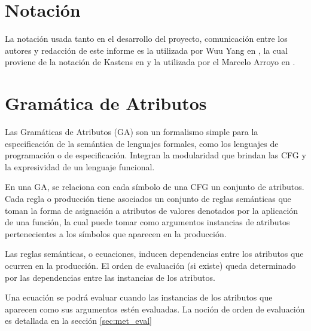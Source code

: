 \section{Notación}

La notación usada tanto en el desarrollo del proyecto, comunicación entre los autores y redacción de este informe es la utilizada por Wuu Yang en \cite{wuu-yang1}, la cual proviene de la notación de Kastens en \cite{kastens} y la utilizada por el Marcelo Arroyo en \cite{tesismarcelo}.

\section{Gramática de Atributos}

Las Gramáticas de Atributos (GA) son un formalismo simple para la especificación de la semántica de lenguajes formales, como los lenguajes de programación o de especificación. Integran la modularidad que brindan las CFG y la expresividad de un lenguaje funcional.

En una GA, se relaciona con cada símbolo de una CFG un conjunto de atributos. Cada regla o producción tiene asociados un conjunto de reglas semánticas que toman la forma de asignación a atributos de valores denotados por la aplicación de una función, la cual puede tomar como argumentos instancias de atributos pertenecientes a los símbolos que aparecen en la producción.

Las reglas semánticas, o ecuaciones, inducen dependencias entre los atributos que ocurren en la producción. El orden de evaluación (si existe) queda determinado por las dependencias entre las instancias de los atributos.

Una ecuación se podrá evaluar cuando las instancias de los atributos que aparecen como sus argumentos estén evaluadas. La noción de orden de evaluación es detallada en la sección \ref{sec:met_eval}


